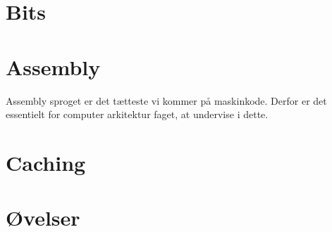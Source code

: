 

\chapter{Bits}
    
    
\chapter{Assembly}
Assembly sproget er det tætteste vi kommer på maskinkode.
Derfor er det essentielt for computer arkitektur faget, at undervise i dette.
    
\chapter{Caching}
    
\chapter{Øvelser}
    
